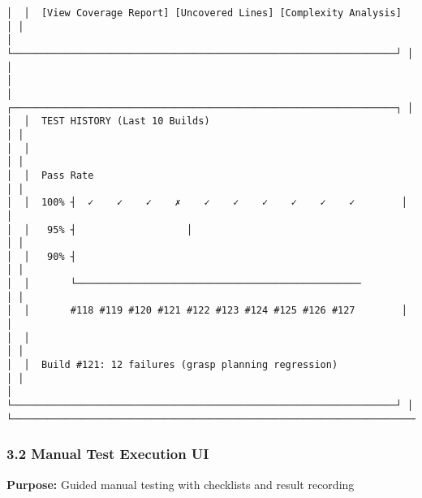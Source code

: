 \documentclass[
]{article}
\begin{document}
\begin{verbatim}
│  │  [View Coverage Report] [Uncovered Lines] [Complexity Analysis]  │ │
│  └──────────────────────────────────────────────────────────────────┘ │
│                                                                        │
│  ┌──────────────────────────────────────────────────────────────────┐ │
│  │  TEST HISTORY (Last 10 Builds)                                   │ │
│  │                                                                   │ │
│  │  Pass Rate                                                        │ │
│  │  100% ┤  ✓    ✓    ✓    ✗    ✓    ✓    ✓    ✓    ✓    ✓        │ │
│  │   95% ┤                   │                                      │ │
│  │   90% ┤                                                           │ │
│  │       └─────────────────────────────────────────────────         │ │
│  │       #118 #119 #120 #121 #122 #123 #124 #125 #126 #127        │ │
│  │                                                                   │ │
│  │  Build #121: 12 failures (grasp planning regression)             │ │
│  └──────────────────────────────────────────────────────────────────┘ │
└────────────────────────────────────────────────────────────────────────┘
\end{verbatim}

\hypertarget{manual-test-execution-ui}{%
\subsubsection{3.2 Manual Test Execution
UI}\label{manual-test-execution-ui}}

\textbf{Purpose:} Guided manual testing with checklists and result
recording
\end{document}
